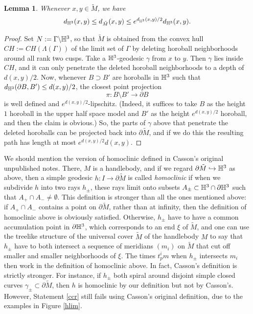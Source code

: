 \documentclass[12pt]{amsart}
\newtheorem{lemma}[theorem]{Lemma}
\theoremstyle{definition}
\theoremstyle{remark}
\begin{document}
\begin{lemma}
Whenever $x,y\in \tilde M$, we have $$d_{\mathbb H^3}(x,y) \leq d_{\tilde M}(x,y)\leq e^{d_{\mathbb H^3}(x,y)/2} d_{\mathbb H^3}(x,y).$$
\end{lemma}
\begin{proof}
Set $N := \Gamma \backslash \mathbb H^3$, so that $\tilde M$ is obtained from the convex hull $CH := CH(\Lambda(\Gamma))$ of the limit set of $\Gamma$ by deleting horoball neighborhoods around all rank two cusps. Take a $\mathbb H^3$-geodesic $\gamma$ from $x$ to $y$. Then $\gamma$ lies inside $CH$, and it can only penetrate the deleted horoball neighborhoods to a depth of $d(x,y)/2$. Now, whenever $B\supset B'$ are horoballs in $\mathbb H^3$ such that $d_{\mathbb H^3}(\partial B, B') \leq d(x,y)/2$, the closest point projection $$\pi : B \setminus B' \longrightarrow \partial B$$ is well defined and $e^{d(x,y)/2}$-lipschitz. (Indeed, it suffices to take $B$ as the height $1$ horoball in the upper half space model and $B'$ as the height $e^{d(x,y)/2}$ horoball, and then the claim is obvious.) So, the parts of $\gamma$ above that penetrate the deleted horoballs can be projected back into $\partial \tilde M$, and if we do this the resulting path has length at most $e^{d(x,y)/2}d(x,y)$.
\end{proof}

We should mention the version of homoclinic defined in Casson's original unpublished notes. There, $M$ is a handlebody, and if we regard $\partial \tilde M \hookrightarrow \mathbb H^3$ as above, then a simple geodesic $ h : I \longrightarrow \partial \tilde M$ is called \emph{homoclinic} if when we subdivide $ h$ into two rays $h_\pm$, these rays limit onto subsets $A_\pm \subset \mathbb H^3 \cap \partial \mathbb H^3$ such that $A_+\cap A_-\neq \emptyset$. This definition is stronger than all the ones mentioned above: if $A_+\cap  A_-$ contains a point on $\partial \tilde M$, rather than at infinity, then the definition of homoclinic above is obviously satisfied. Otherwise, $h_\pm$ have to have a common accumulation point in $\partial \mathbb H^3$, which corresponds to an end $\xi$ of $\tilde M$, and one can use the treelike structure of the universal cover $\tilde M$ of the handlebody $M$ to say that $h_\pm$ have to both intersect a sequence of meridians $(m_i)$ on $\tilde M$ that cut off smaller and smaller neighborhoods of $\xi$. The times $t^i_pm$ when $h_\pm$ intersects $m_i$ then work in the definition of homoclinic above. In fact, Casson's definition is strictly stronger. For instance, if $h_\pm$ both spiral around disjoint simple closed curves $\gamma_\pm \subset \partial \tilde M$, then $h$ is homoclinic by our definition but not by Casson's. However, Statement \ref{ccr} still fails using Casson's original definition, due to the examples in Figure \ref{hlim}.
\end{document}
